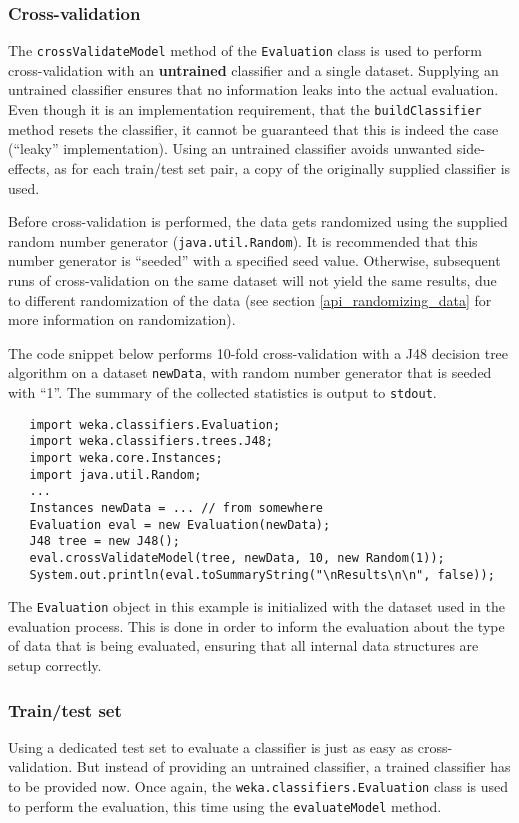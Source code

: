 \subsubsection*{Cross-validation}
The \texttt{crossValidateModel} method of the \texttt{Evaluation} class is used
to perform cross-validation with an \textbf{untrained} classifier and a single
dataset. Supplying an untrained classifier ensures that no information leaks
into the actual evaluation. Even though it is an implementation requirement,
that the \texttt{buildClassifier} method resets the classifier, it cannot be
guaranteed that this is indeed the case (``leaky'' implementation). Using an
untrained classifier avoids unwanted side-effects, as for each train/test set
pair, a copy of the originally supplied classifier is used.

Before cross-validation is performed, the data gets randomized using the
supplied random number generator (\texttt{java.util.Random}). It is
recommended that this number generator is ``seeded'' with a specified seed
value. Otherwise, subsequent runs of cross-validation on the same dataset will
not yield the same results, due to different randomization of the data (see
section \ref{api_randomizing_data} for more information on randomization).

The code snippet below performs 10-fold cross-validation with a J48 decision
tree algorithm on a dataset \texttt{newData}, with random number generator that
is seeded with ``1''. The summary of the collected statistics is output to
\texttt{stdout}.

\newpage

\begin{verbatim}
   import weka.classifiers.Evaluation;
   import weka.classifiers.trees.J48;
   import weka.core.Instances;
   import java.util.Random;
   ...
   Instances newData = ... // from somewhere
   Evaluation eval = new Evaluation(newData);
   J48 tree = new J48();
   eval.crossValidateModel(tree, newData, 10, new Random(1));
   System.out.println(eval.toSummaryString("\nResults\n\n", false));
\end{verbatim}
The \texttt{Evaluation} object in this example is initialized with the dataset
used in the evaluation process. This is done in order to inform the evaluation
about the type of data that is being evaluated, ensuring that all internal data
structures are setup correctly.

\subsubsection*{Train/test set}
Using a dedicated test set to evaluate a classifier is just as easy as
cross-validation. But instead of providing an untrained classifier, a trained
classifier has to be provided now. Once again, the
\texttt{weka.classifiers.Evaluation} class is used to perform the evaluation,
this time using the \texttt{evaluateModel} method.

